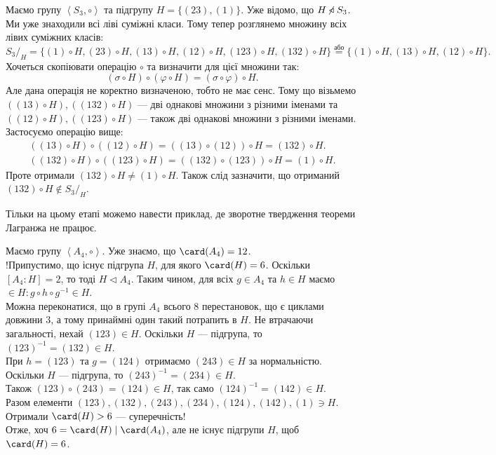 \documentclass{math_library}
\begin{document}
\begin{example}
Маємо групу $\left<S_3, \circ \right>$ та підгрупу $H = \{(23), (1)\}$. Уже відомо, що $H \centernot\triangleleft S_3$. Ми уже знаходили всі ліві суміжні класи. Тому тепер розглянемо множину всіх лівих суміжних класів:
\[
{S_3}/_H = \{ (1) \circ H, (23) \circ H, (13) \circ H, (12) \circ H, (123)\circ H, (132) \circ H \} \overset{\text{або}}{=} \{ (1) \circ H, (13) \circ H, (12) \circ H \}.
\]
Хочеться скопіювати операцію $\circ$ та визначити для цієї множини так:
\[
(\sigma \circ H) \circ (\varphi \circ H) = (\sigma \circ \varphi) \circ H.
\]
Але дана операція не коректно визначеною, тобто не має сенс. Тому що візьмемо $((13) \circ H), ( (132)\circ H)$ --- дві однакові множини з різними іменами та $( (12) \circ H), ( (123) \circ H)$ --- також дві однакові множини з різними іменами. Застосуємо операцію вище:
\begin{align*}
((13) \circ H) \circ ((12)\circ H) = ((13)\circ (12)) \circ H = (132) \circ H. \\
((132) \circ H) \circ ((123) \circ H) = ((132) \circ (123)) \circ H = (1) \circ H.
\end{align*}
Проте отримали $(132) \circ H \neq (1) \circ H$. Також слід зазначити, що отриманий $(132) \circ H \notin S_3/_H$.
\end{example}

\begin{remark}
Тільки на цьому етапі можемо навести приклад, де зворотне твердження теореми Лагранжа не працює.
\end{remark}

\begin{example} Маємо групу $\left< A_4, \circ \right>$. Уже знаємо, що $\card(A_4) = 12$.\\
!Припустимо, що існує підгрупа $H$, для якого $\card(H) = 6$. Оскільки $[A_4 : H] = 2$, то тоді $H \triangleleft A_4$. Таким чином, для всіх $g \in A_4$ та $h \in H$ маємо $\in H: g \circ h \circ g^{-1} \in H$.\\
Можна переконатися, що в групі $A_4$ всього $8$ перестановок, що є циклами довжини $3$, а тому принаймні один такий потрапить в $H$. Не втрачаючи загальності, нехай $(123) \in H$. Оскільки $H$ --- підгрупа, то $(123)^{-1} = (132) \in H$.\\
При $h = (123)$ та $g = (124)$ отримаємо $(243) \in H$ за нормальністю. Оскільки $H$ --- підгрупа, то $(243)^{-1} = (234) \in H$.\\
Також $(123) \circ (243) = (124) \in H$, так само $(124)^{-1} = (142) \in H$.\\
Разом елементи $(123),(132),(243),(234),(124),(142),(1) \ni H$. Отримали $\card(H) > 6$ --- суперечність!\\
Отже, хоч $6 = \card(H) \mid \card(A_4)$, але не існує підгрупи $H$, щоб $\card(H) = 6$.
\end{example}
\end{document}
